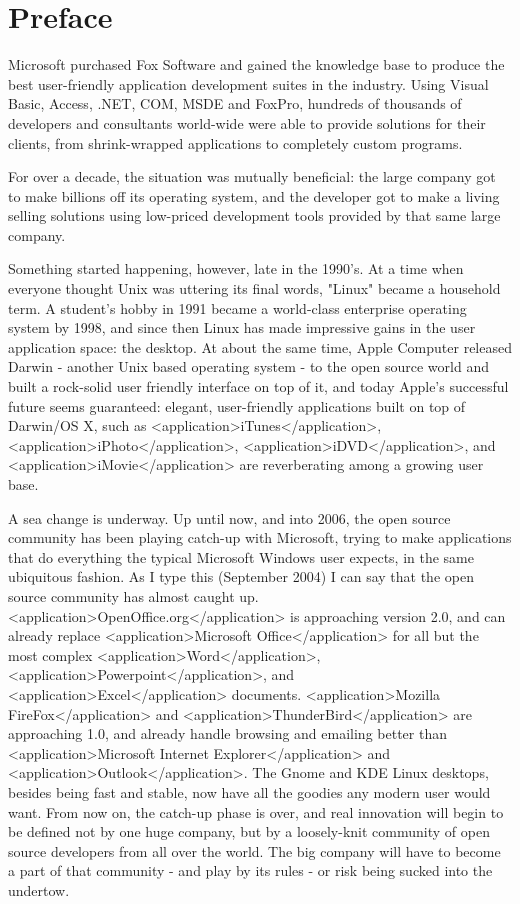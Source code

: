 
\chapter{Preface}

Microsoft purchased Fox Software and gained the knowledge base to produce the best user-friendly application development suites in the industry. Using Visual Basic, Access, .NET, COM, MSDE and FoxPro, hundreds of thousands of developers and consultants world-wide were able to provide solutions for their clients, from shrink-wrapped applications to completely custom programs.

For over a decade, the situation was mutually beneficial: the large company got to make billions off its operating system, and the developer got to make a living selling solutions using low-priced development tools provided by that same large company.

Something started happening, however, late in the 1990's. At a time when everyone thought Unix was uttering its final words, "Linux" became a household term. A student's hobby in 1991 became a world-class enterprise operating system by 1998, and since then Linux has made impressive gains in the user application space: the desktop. At about the same time, Apple Computer released Darwin - another Unix based operating system - to the open source world and built a rock-solid user friendly interface on top of it, and today Apple's successful future seems guaranteed: elegant, user-friendly applications built on top of Darwin/OS X, such as <application>iTunes</application>, <application>iPhoto</application>, <application>iDVD</application>, and <application>iMovie</application> are reverberating among a growing user base.

A sea change is underway. Up until now, and into 2006, the open source community has been playing catch-up with Microsoft, trying to make applications that do everything the typical Microsoft Windows user expects, in the same ubiquitous fashion. As I type this (September 2004) I can say that the open source community has almost caught up. <application>OpenOffice.org</application> is approaching version 2.0, and can already replace <application>Microsoft Office</application> for all but the most complex <application>Word</application>, <application>Powerpoint</application>, and <application>Excel</application> documents. <application>Mozilla FireFox</application> and <application>ThunderBird</application> are approaching 1.0, and already handle browsing and emailing better than <application>Microsoft Internet Explorer</application> and <application>Outlook</application>. The Gnome and KDE Linux desktops, besides being fast and stable, now have all the goodies any modern user would want. From now on, the catch-up phase is over, and real innovation will begin to be defined not by one huge company, but by a loosely-knit community of open source developers from all over the world. The big company will have to become a part of that community - and play by its rules - or risk being sucked into the undertow.

